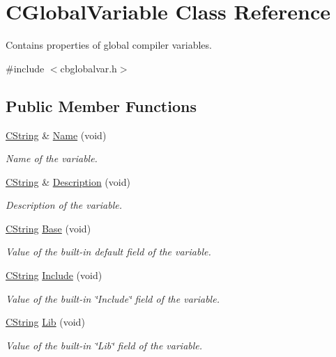 \hypertarget{classCGlobalVariable}{\section{C\-Global\-Variable Class Reference}
\label{classCGlobalVariable}
}


Contains properties of global compiler variables.  




{\ttfamily \#include $<$cbglobalvar.\-h$>$}

\subsection*{Public Member Functions}
\begin{DoxyCompactItemize}
\item 
\hyperlink{classCString}{C\-String} \& \hyperlink{classCGlobalVariable_ad969569563c43f2e531048f12680e86b}{Name} (void)
\begin{DoxyCompactList}\small\item\em Name of the variable. \end{DoxyCompactList}\item 
\hyperlink{classCString}{C\-String} \& \hyperlink{classCGlobalVariable_a8b5f004ada72bf8a6a385201eca1bcec}{Description} (void)
\begin{DoxyCompactList}\small\item\em Description of the variable. \end{DoxyCompactList}\item 
\hyperlink{classCString}{C\-String} \hyperlink{classCGlobalVariable_a343f767d0e98936bd987fe5543cc5136}{Base} (void)
\begin{DoxyCompactList}\small\item\em Value of the built-\/in default field of the variable. \end{DoxyCompactList}\item 
\hyperlink{classCString}{C\-String} \hyperlink{classCGlobalVariable_a38ea7ccde81095a5db6574b741eab786}{Include} (void)
\begin{DoxyCompactList}\small\item\em Value of the built-\/in \char`\"{}\-Include\char`\"{} field of the variable. \end{DoxyCompactList}\item 
\hyperlink{classCString}{C\-String} \hyperlink{classCGlobalVariable_adb642bd9f4c1d2ccd80f1bb494b59a94}{Lib} (void)
\begin{DoxyCompactList}\small\item\em Value of the built-\/in \char`\"{}\-Lib\char`\"{} field of the variable. \end{DoxyCompactList}\item 

\end{DoxyCompactItemize}
